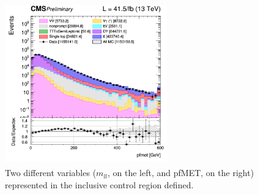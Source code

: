 \documentclass[a4paper, 10pt, openright]{report}
\begin{document}
\begin{figure}[htbp]
{\begin{minipage}[b]{.48\textwidth}
\end{minipage}\hfill
\begin{minipage}[b]{.48\textwidth}
\includegraphics[width=7cm, height=7cm]{figs/log_cratio_inclusiveCR_ll_METcorrected_pt_2017.png}
\end{minipage} \hfill
}
\caption{Two different variables ($m_{ll}$, on the left, and pf\ac{MET}, on the right) represented in the inclusive control region defined.}
\label{fig:DYCR1}
\end{figure}
\end{document}
